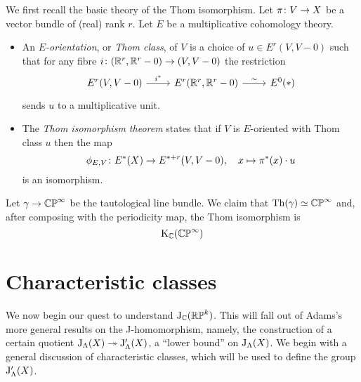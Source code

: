 \begin{nothing}
  \label{thom-iso}
  We first recall the basic theory of the Thom isomorphism. Let $\pi
  \colon V \to X$ be a vector bundle of (real) rank $r$. Let $E$ be a
  multiplicative cohomology theory.
  \begin{itemize}[leftmargin=*]
  \item An \emph{$E$-orientation}, or \emph{Thom class}, of $V$ is a
    choice of $u \in E^r(V,V-0)$ such that for any fibre $i \colon
    (\mathbb{R}^r,\mathbb{R}^r-0) \to (V,V-0)$ the restriction
    \[
    \begin{tikzcd}
      E^r(V,V-0) \rar{i^*} & E^r(\R^r, \R^r-0) \rar{\sim} & E^0(*)
    \end{tikzcd}
    \]
    sends $u$ to a multiplicative unit.
  \item The \emph{Thom isomorphism theorem} states that if $V$ is
    $E$-oriented with Thom class $u$ then the map
    \[
    \phi_{E,V} \colon E^*(X) \to E^{*+r}(V,V-0), \quad x \mapsto \pi^*(x)
    \cdot u
    \]
    is an isomorphism.
  \end{itemize}
\end{nothing}

\begin{example}
  \label{taut-thom}
  Let $\gamma \to \mathbb{CP}^\infty$ be the tautological line bundle. We
  claim that $\operatorname{Th}(\gamma) \simeq \mathbb{CP}^\infty$ and, after composing with
  the periodicity map, the Thom isomorphism is 
  \[
  \mathrm{K}_{\mathbb{C}}(\mathbb{CP}^\infty) 
  \]
\end{example}


\section{Characteristic classes}

We now begin our quest to understand $\mathrm{J}_{\mathbb{C}}(\mathbb{RP}^k)$. This will fall
out of Adams's more general results on the J-homomorphism, namely, the
construction of a certain quotient $\mathrm{J}_\Lambda(X) \twoheadrightarrow
\mathrm{J}'_\Lambda(X)$, a ``lower bound'' on $\mathrm{J}_\Lambda(X)$. We begin with a
general discussion of characteristic classes, which will be used to
define the group $\mathrm{J}'_\Lambda(X)$.

